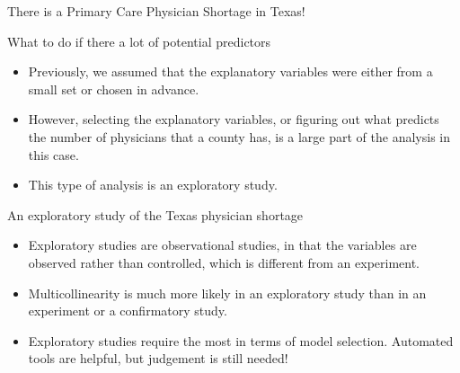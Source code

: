 \documentclass{beamer}\usepackage[]{graphicx}\usepackage[]{color}
\makeatletter
\newcommand{\hlopt}[1]{\textcolor[rgb]{1,0.894,0.769}{#1}}%
\newcommand{\hlstd}[1]{\textcolor[rgb]{1,0.894,0.769}{#1}}%
\newcommand{\hlkwb}[1]{\textcolor[rgb]{0.804,0.776,0.451}{#1}}%
\newcommand{\hlkwd}[1]{\textcolor[rgb]{1,0.78,0.769}{#1}}%
\newenvironment{kframe}{%
 \def\at@end@of@kframe{}%
 \ifinner\ifhmode%
  \def\at@end@of@kframe{\end{minipage}}%
  \begin{minipage}{\columnwidth}%
 \fi\fi%
 \def\FrameCommand##1{\hskip\@totalleftmargin \hskip-\fboxsep
 \colorbox{shadecolor}{##1}\hskip-\fboxsep
     \hskip-\linewidth \hskip-\@totalleftmargin \hskip\columnwidth}%
 \MakeFramed {\advance\hsize-\width
   \@totalleftmargin\z@ \linewidth\hsize
   \@setminipage}}%
 {\par\unskip\endMakeFramed%
 \at@end@of@kframe}
\newenvironment{knitrout}{}{} %
\makeatother
\begin{document}
\begin{darkframes}
\begin{frame}{There is a Primary Care Physician Shortage in Texas!}
    \end{frame}

    \begin{frame}[fragile]{What to do if there a lot of potential predictors}
      \begin{itemize}[<+->]
        \item Previously, we assumed that the explanatory variables were either from a small set or chosen in advance.
        \item However, selecting the explanatory variables, or figuring out what predicts the number of physicians that a county has, is a large part of the analysis in this case.
        \item This type of analysis is an exploratory study.
      \end{itemize} 
    \end{frame}

    \begin{frame}[fragile]{An exploratory study of the Texas physician shortage}
      \begin{itemize}[<+->]
        \item Exploratory studies are observational studies, in that the variables are observed rather than controlled, which is different from an experiment.
        \item Multicollinearity is much more likely in an exploratory study than in an experiment or a confirmatory study.
        \item Exploratory studies require the most in terms of model selection. Automated tools are helpful, but judgement is still needed!
      \end{itemize} 
    \end{frame}

\end{darkframes}
\end{document}
